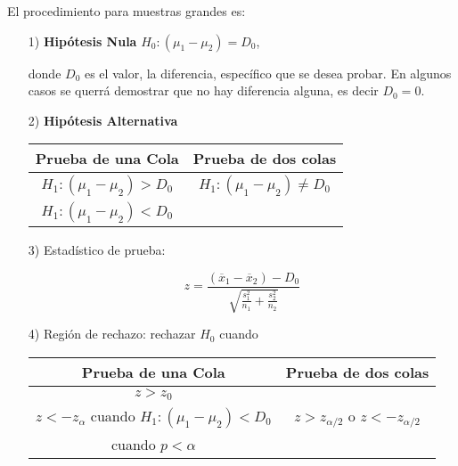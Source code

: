 El procedimiento para muestras grandes es:
\begin{itemize}
\item[1) ] \textbf{Hip\'otesis Nula} $H_{0}:\left(\mu_{1}-\mu_{2}\right)=D_{0}$,

donde $D_{0}$ es el valor, la diferencia, espec\'ifico que se desea probar. En algunos casos se querr\'a demostrar que no hay diferencia alguna, es decir $D_{0}=0$.

\item[2) ] \textbf{Hip\'otesis Alternativa}

\begin{tabular}{cc}\hline
\textbf{Prueba de una Cola} & \textbf{Prueba de dos colas}\\\hline
$H_{1}:\left(\mu_{1}-\mu_{2}\right)>D_{0}$ & $H_{1}:\left(\mu_{1}-\mu_{2}\right)\neq D_{0}$\\ 
$H_{1}:\left(\mu_{1}-\mu_{2}\right)<D_{0}$&\\
\end{tabular}

\item[3) ] Estad\'istico de prueba:

$$z=\frac{\left(\overline{x}_{1}-\overline{x}_{2}\right)-D_{0}}{\sqrt{\frac{s^{2}_{1}}{n_{1}}+\frac{s^{2}_{2}}{n_{2}}}}$$

\item[4) ] Regi\'on de rechazo: rechazar $H_{0}$ cuando

\begin{tabular}{cc}\hline
\textbf{Prueba de una Cola} & \textbf{Prueba de dos colas}\\\hline
$z>z_{0}$ & \\
$z<-z_{\alpha}$ cuando $H_{1}:\left(\mu_{1}-\mu_{2}\right)<D_{0}$&$z>z_{\alpha/2}$ o $z<-z_{\alpha/2}$\\
 cuando $p<\alpha$&\\
\end{tabular}
\end{itemize}

